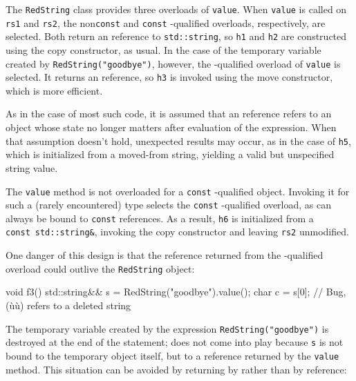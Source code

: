 \noindent The \lstinline!RedString! class provides three 
overloads of \lstinline!value!. When \lstinline!value! is called on
\lstinline!rs1! and \lstinline!rs2!, the non\lstinline!const! and \lstinline!const!
-qualified overloads, respectively, are selected. Both
return an  reference to \lstinline!std::string!, so
\lstinline!h1! and \lstinline!h2! are constructed using the copy constructor,
as usual. In the case of the temporary variable created by
\lstinline!RedString("goodbye")!, however, the -qualified
overload of \lstinline!value! is selected. It returns an 
reference, so \lstinline!h3! is invoked using the move constructor, which
is more efficient.

As in the case of most such code, it is assumed that an 
reference refers to an object whose state no longer matters after
evaluation of the expression. When that assumption doesn't hold,
unexpected results may occur, as in the case of \lstinline!h5!, which is
initialized from a moved-from string, yielding a valid but unspecified
string value.

The \lstinline!value! method is not overloaded for a \lstinline!const!
-qualified object. Invoking it for such a (rarely
encountered) type selects the \lstinline!const! -qualified
overload, as  can always be bound to \lstinline!const!
 references. As a result, \lstinline!h6! is initialized from a
\lstinline!const!~\lstinline!std::string&!, invoking the copy constructor and
leaving \lstinline!rs2! unmodified.

One danger of this design is that the reference returned from the
-qualified overload could outlive the \lstinline!RedString!
object:

\begin{emcppslisting}[emcppsbatch=e3]
void f3()
{
    std::string&& s = RedString("goodbye").value();
    char c = s[0];  // Bug, (ù{}ù) refers to a deleted string
}
\end{emcppslisting}
    

\noindent The temporary variable created by the expression
\lstinline!RedString("goodbye")! is destroyed at the end of the statement;
 does not come into play because \lstinline!s!
is not bound to the temporary object itself, but to a reference returned
by the \lstinline!value! method. This situation can be avoided by returning
by  rather than by reference:

